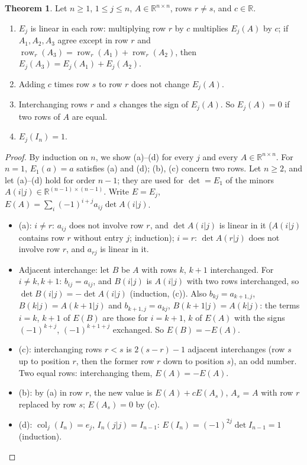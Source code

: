 \documentclass[12pt]{article}
\newcommand{\R}{\mathbb R}
\DeclareMathOperator{\col}{col}
\theoremstyle{definition}
\newtheorem{theorem}{Theorem}
\DeclareMathOperator{\row}{row}
\begin{document}
\begin{theorem}\label{b5.13}
Let \(n\geqslant1\), \(1\leqslant j\leqslant n\), \(A\in\R^{n\times n}\), rows \(r\ne s\), and \(c\in\R\).
\begin{enumerate}
\item \(E_j\) is linear in each row: multiplying row \(r\) by \(c\) multiplies \(E_j(A)\) by \(c\); if \(A_1,A_2,A_3\) agree
except in row \(r\) and \(\row_r(A_3)=\row_r(A_1)+\row_r(A_2)\), then \(E_j(A_3)=E_j(A_1)+E_j(A_2)\).
\item Adding \(c\) times row \(s\) to row \(r\) does not change \(E_j(A)\).
\item Interchanging rows \(r\) and \(s\) changes the sign of \(E_j(A)\). So \(E_j(A)=0\) if two rows of \(A\) are equal.
\item \(E_j(I_n)=1\).
\end{enumerate}
\end{theorem}
\begin{proof}
By induction on \(n\), we show (a)--(d) for every \(j\) and every \(A\in\R^{n\times n}\). For \(n=1\), \(E_1(a)=a\)
satisfies (a) and (d); (b), (c) concern two rows. Let \(n\geqslant2\), and let (a)--(d) hold for order \(n-1\); they
are used for \(\det=E_1\) of the minors \(A(i|j)\in\R^{(n-1)\times(n-1)}\). Write \(E=E_j\),
\(E(A)=\sum_i(-1)^{i+j}a_{ij}\det A(i|j)\).
\begin{itemize}
\item (a): \(i\ne r\): \(a_{ij}\) does not involve row \(r\), and \(\det A(i|j)\) is linear in it (\(A(i|j)\) contains row
\(r\) without entry \(j\); induction); \(i=r\): \(\det A(r|j)\) does not involve row \(r\), and \(a_{rj}\) is linear in it.
\item Adjacent interchange: let \(B\) be \(A\) with rows \(k\), \(k+1\) interchanged. For \(i\ne k,k+1\): \(b_{ij}=a_{ij}\),
and \(B(i|j)\) is \(A(i|j)\) with two rows interchanged, so \(\det B(i|j)=-\det A(i|j)\) (induction, (c)). Also
\(b_{kj}=a_{k+1,j}\), \(B(k|j)=A(k+1|j)\) and \(b_{k+1,j}=a_{kj}\), \(B(k+1|j)=A(k|j)\): the terms \(i=k\), \(k+1\) of
\(E(B)\) are those for \(i=k+1\), \(k\) of \(E(A)\) with the signs \((-1)^{k+j}\), \((-1)^{k+1+j}\) exchanged. So
\(E(B)=-E(A)\).
\item (c): interchanging rows \(r<s\) is \(2(s-r)-1\) adjacent interchanges (row \(s\) up to position \(r\), then the former
row \(r\) down to position \(s\)), an odd number. Two equal rows: interchanging them, \(E(A)=-E(A)\).
\item (b): by (a) in row \(r\), the new value is \(E(A)+cE(A_s)\), \(A_s\) = \(A\) with row \(r\) replaced by row \(s\);
\(E(A_s)=0\) by (c).
\item (d): \(\col_j(I_n)=e_j\), \(I_n(j|j)=I_{n-1}\): \(E(I_n)=(-1)^{2j}\det I_{n-1}=1\) (induction).\qedhere
\end{itemize}
\end{proof}
\end{document}
